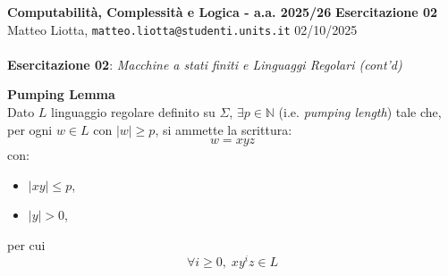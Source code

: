 \documentclass[a4paper,10pt]{article}
\newcommand{\EsercitazioneNum}{02}
\newcommand{\Data}{02/10/2025}
\begin{document}
\footnotesize  %

\noindent
\small \textbf{Computabilità, Complessità e Logica - a.a. 2025/26} \hfill \textbf{Esercitazione \EsercitazioneNum} \\[0.2cm]
\scriptsize Matteo Liotta, \texttt{matteo.liotta@studenti.units.it} \hfill \Data \\[0.2cm]

\noindent\makebox[\linewidth]{\rule{\linewidth}{0.4pt}} \\[1cm]


\noindent\Large \textbf{Esercitazione \EsercitazioneNum}: \textit{Macchine a stati finiti e Linguaggi Regolari (cont'd)}\\[0cm]
\begin{osservazioni}
    \textbf{Pumping Lemma}\\
    Dato $L$ linguaggio regolare definito su $\Sigma$, $\exists p \in \mathbb{N}$ (i.e. \emph{pumping length}) tale che, per ogni $w \in L$ con $|w|\geq p$, si ammette la scrittura:
    $$w = xyz$$
    con:
    \begin{itemize}
        \item $|xy| \leq p$,
        \item $|y| > 0$,
    \end{itemize}
    per cui $$\forall i \geq 0,\; x y^i z \in L$$
\end{osservazioni}
\end{document}
